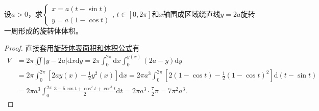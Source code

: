 \documentclass[../../main.tex]{subfiles}%
\begin{document}
\begin{example}
设$a>0$，求$\begin{cases}x=a(t-\sin t)\\y=a(1-\cos t)\end{cases},\,t\in[0,2\pi]$和$x$轴围成区域绕直线$y=2a$旋转一周形成的旋转体体积。
\end{example}
\begin{proof}

直接套用\hyperref[theorem:旋转体表面积和体积公式]{旋转体表面积和体积公式}有
\begin{align*}
V &= 2\pi \iint |y-2a|\mathrm{d}x\mathrm{d}y = 2\pi \int_{0}^{2\pi}\mathrm{d}x \int_{0}^{y(x)} (2a-y)\mathrm{d}y \\
&= 2\pi \int_{0}^{2\pi}\left[2a y(x)-\frac{1}{2}y^2(x)\right]\mathrm{d}x
=2\pi a^3 \int_{0}^{2\pi}\left[2(1-\cos t)-\frac{1}{2}(1-\cos t)^2\right]\mathrm{d}(t-\sin t) \\
&=2\pi a^3 \int_{0}^{2\pi}\frac{3-5\cos t+\cos^2 t+\cos^3 t}{2}\mathrm{d}t
=2\pi a^3\cdot \frac{7}{2}\pi=7\pi^2 a^3.
\end{align*}
\end{proof}
\end{document}
